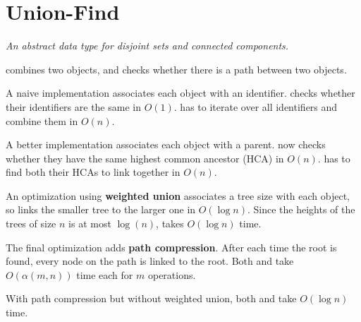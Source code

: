 \section{Union-Find}
\emph{An abstract data type for disjoint sets and connected components.}

 combines two objects, and  checks whether there is a path between two objects.

A naive implementation associates each object with an identifier.
 checks whether their identifiers are the same in $O(1)$.
 has to iterate over all identifiers and combine them in $O(n)$.

A better implementation associates each object with a parent.
 now checks whether they have the same highest common ancestor (HCA) in $O(n)$.
 has to find both their HCAs to link together in $O(n)$.

An optimization using \textbf{weighted union} associates a tree size with each object,
so  links the smaller tree to the larger one in $O(\log n)$.
Since the heights of the trees of size $n$ is at most $\log(n)$,  takes $O(\log n)$ time.


The final optimization adds \textbf{path compression}.
After each time the root is found, every node on the path is linked to the root.
Both  and  take $O(\alpha(m, n))$ time each for $m$ operations.

With path compression but without weighted union, both  and  take $O(\log n)$ time.